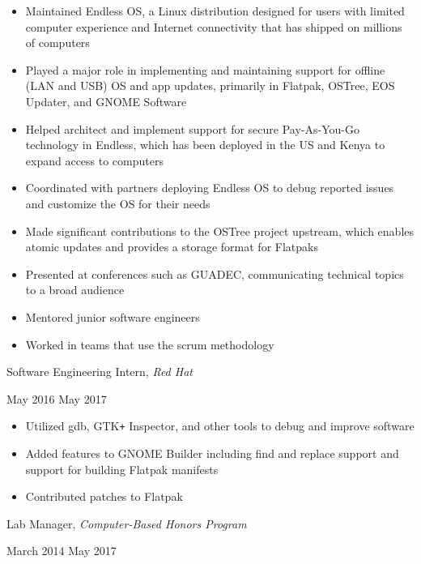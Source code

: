 \documentclass[11pt]{article}
\begin{document}
\begin{itemize}
  \item Maintained Endless OS, a Linux distribution designed for users with limited computer experience and Internet connectivity that has shipped on millions of computers
  \item Played a major role in implementing and maintaining support for offline (LAN and USB) OS and app updates, primarily in Flatpak, OSTree, EOS Updater, and GNOME Software
  \item Helped architect and implement support for secure Pay-As-You-Go technology in Endless, which has been deployed in the US and Kenya to expand access to computers
  \item Coordinated with partners deploying Endless OS to debug reported issues and customize the OS for their needs
  \item Made significant contributions to the OSTree project upstream, which enables atomic updates and \mbox{provides} a storage format for Flatpaks
  \item Presented at conferences such as GUADEC, communicating technical topics to a broad audience
  \item Mentored junior software engineers
  \item Worked in teams that use the scrum methodology
\end{itemize}

\newpage

\begin{minipage}[t]{0.65\textwidth}
\flushleft
Software Engineering Intern, \textit{Red Hat}\\
\end{minipage}
\begin{minipage}[t]{0.30\textwidth}
\flushright
May 2016 \space \textemdash \space May 2017\\
\end{minipage}

\begin{itemize}
  \item Utilized gdb, GTK\texttt{+} Inspector, and other tools to debug and improve software
  \item Added features to GNOME Builder including find and replace support and support for building Flatpak manifests
  \item Contributed patches to Flatpak
\end{itemize}

\begin{minipage}[t]{0.65\textwidth}
\flushleft
Lab Manager, \textit{Computer-Based Honors Program}\\
\end{minipage}
\begin{minipage}[t]{0.30\textwidth}
\flushright
March 2014 \space \textemdash \space May 2017\\
\end{minipage}
\end{document}
